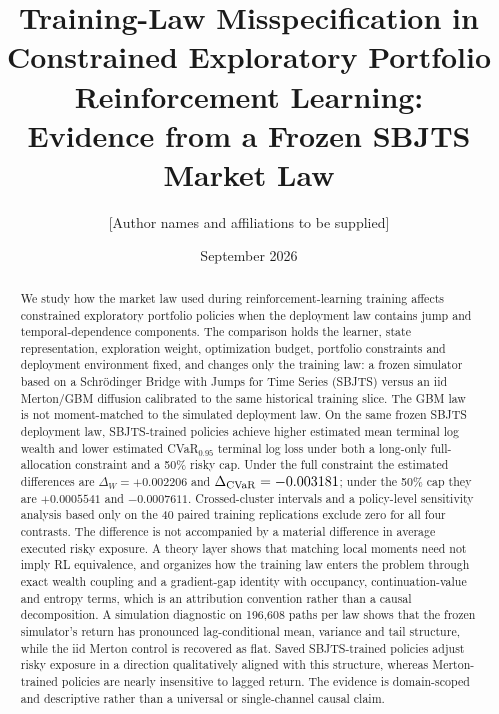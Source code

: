 \documentclass[11pt]{article}
\title{Training-Law Misspecification in Constrained Exploratory Portfolio Reinforcement Learning:\\Evidence from a Frozen SBJTS Market Law}
\author{[Author names and affiliations to be supplied]}
\date{September 2026}
\begin{document}
\maketitle
\begin{abstract}
We study how the market law used during reinforcement-learning training affects constrained exploratory portfolio policies when the deployment law contains jump and temporal-dependence components. The comparison holds the learner, state representation, exploration weight, optimization budget, portfolio constraints and deployment environment fixed, and changes only the training law: a frozen simulator based on a Schr\"odinger Bridge with Jumps for Time Series (SBJTS) versus an iid Merton/GBM diffusion calibrated to the same historical training slice. The GBM law is not moment-matched to the simulated deployment law. On the same frozen SBJTS deployment law, SBJTS-trained policies achieve higher estimated mean terminal log wealth and lower estimated CVaR$_{0.95}$ terminal log loss under both a long-only full-allocation constraint and a 50\% risky cap. Under the full constraint the estimated differences are $\Delta_W=+0.002206$ and $\Delta_{\rm CVaR}=-0.003181$; under the 50\% cap they are $+0.0005541$ and $-0.0007611$. Crossed-cluster intervals and a policy-level sensitivity analysis based only on the 40 paired training replications exclude zero for all four contrasts. The difference is not accompanied by a material difference in average executed risky exposure. A theory layer shows that matching local moments need not imply RL equivalence, and organizes how the training law enters the problem through exact wealth coupling and a gradient-gap identity with occupancy, continuation-value and entropy terms, which is an attribution convention rather than a causal decomposition. A simulation diagnostic on 196,608 paths per law shows that the frozen simulator's return has pronounced lag-conditional mean, variance and tail structure, while the iid Merton control is recovered as flat. Saved SBJTS-trained policies adjust risky exposure in a direction qualitatively aligned with this structure, whereas Merton-trained policies are nearly insensitive to lagged return. The evidence is domain-scoped and descriptive rather than a universal or single-channel causal claim.
\end{abstract}
\end{document}
